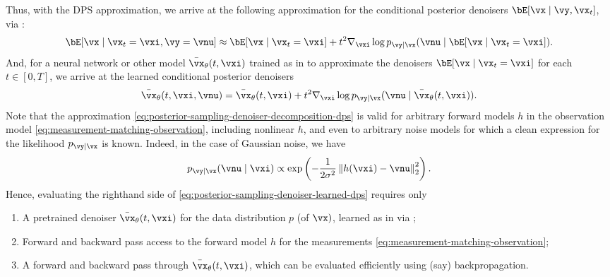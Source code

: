 \documentclass[../../book-main.tex]{subfiles}
\begin{document}
Thus, with the DPS approximation, we arrive at the following approximation for
the conditional posterior denoisers $\bE[\vx \mid \vy, \vx_t]$, via
:
\begin{equation}
  \bE[ \vx \mid \vx_t=\vxi, \vy=\vnu]
  \approx
  \bE[\vx \mid \vx_t=\vxi] 
  + t^2 \nabla_{\vxi} \log p_{\vy \mid \vx}(\vnu \mid \bE[\vx \mid \vx_t = \vxi]).
  \label{eq:posterior-sampling-denoiser-decomposition-dps}
\end{equation}
And, for a neural network or other model $\bar{\vx}_{\theta}(t, \vxi)$ 
trained as in  to approximate the denoisers
$\bE[\vx \mid \vx_t = \vxi]$ for each $t \in [0, T]$, we arrive at the learned
conditional posterior denoisers
\begin{equation}
  \bar{\vx}_{\theta}(t, \vxi, \vnu) 
  = \bar{\vx}_{\theta}(t, \vxi)
  + t^2 \nabla_{\vxi} \log p_{\vy \mid \vx}(\vnu \mid \bar{\vx}_{\theta}(t,
  \vxi)).
  \label{eq:posterior-sampling-denoiser-learned-dps}
\end{equation}
Note that the approximation
\eqref{eq:posterior-sampling-denoiser-decomposition-dps} is  valid for arbitrary
forward models $h$ in the
observation model \eqref{eq:measurement-matching-observation}, including
nonlinear $h$, and even to
arbitrary noise models for which a clean expression for the likelihood $p_{\vy
\mid \vx}$ is known. Indeed, in the case of Gaussian noise, we have
\begin{equation}
  p_{\vy \mid \vx}(\vnu \mid \vxi)
  \propto
  \exp\left(
    -\frac{1}{2\sigma^2} \norm*{ h(\vxi) - \vnu }_2^2
  \right).
\end{equation}
Hence, evaluating the righthand side of
\eqref{eq:posterior-sampling-denoiser-learned-dps}
requires only
\begin{enumerate}
  \item A pretrained denoiser $\bar{\vx}_{\theta}(t, \vxi)$ for the data distribution $p$
    (of $\vx)$, learned as in  via
    ;
  \item Forward and backward pass access to the forward model $h$ for the
    measurements \eqref{eq:measurement-matching-observation};
  \item A forward and backward pass through $\bar{\vx}_{\theta}(t, \vxi)$, which can be evaluated
    efficiently using (say) backpropagation.
\end{enumerate}
\end{document}
